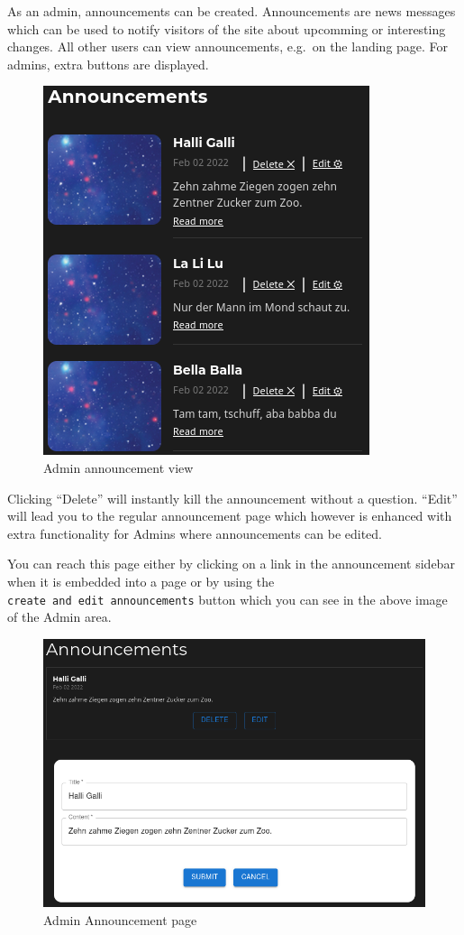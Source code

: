 \documentclass[
]{article}
\begin{document}
As an admin, announcements can be created. Announcements are news
messages which can be used to notify visitors of the site about
upcomming or interesting changes. All other users can view
announcements, e.g.~on the landing page. For admins, extra buttons are
displayed.

\begin{figure}
\centering
\includegraphics{images/announcements_sidebar_admin.png}
\caption{Admin announcement view}
\end{figure}\newpage

Clicking ``Delete'' will instantly kill the announcement without a
question. ``Edit'' will lead you to the regular announcement page which
however is enhanced with extra functionality for Admins where
announcements can be edited.

You can reach this page either by clicking on a link in the announcement
sidebar when it is embedded into a page or by using the
\texttt{create\ and\ edit\ announcements} button which you can see in
the above image of the Admin area.

\begin{figure}
\centering
\includegraphics{images/announcement_edit.png}
\caption{Admin Announcement page}
\end{figure}\newpage
\end{document}
